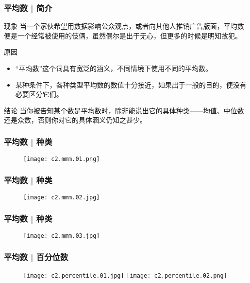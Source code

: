 \begin{frame}
  \frametitle{平均数 | 简介}
  \begin{block}{现象}
    当一个家伙希望用数据影响公众观点，或者向其他人推销广告版面，平均数便是一个经常被使用的伎俩，虽然偶尔是出于无心，但更多的时候是明知故犯。
  \end{block}
  \pause
  \begin{block}{原因}
    \begin{itemize}
      \item “平均数”这个词具有宽泛的涵义，不同情境下使用不同的平均数。
      \item 某种条件下，各种类型平均数的数值十分接近，如果出于一般的目的，便没有必要区分它们。
    \end{itemize}
  \end{block}
  \pause
  \begin{block}{结论}
    当你被告知某个数是平均数时，除非能说出它的具体种类——均值、中位数还是众数，否则你对它的具体涵义仍知之甚少。
  \end{block}
\end{frame}

\begin{frame}
  \frametitle{平均数 | 种类}
  \begin{figure}
    \centering
    \texttt{[image: c2.mmm.01.png]}
  \end{figure}
\end{frame}

\begin{frame}
  \frametitle{平均数 | 种类}
  \begin{figure}
    \centering
    \texttt{[image: c2.mmm.02.jpg]}
  \end{figure}
\end{frame}

\begin{frame}
  \frametitle{平均数 | 种类}
  \begin{figure}
    \centering
    \texttt{[image: c2.mmm.03.jpg]}
  \end{figure}
\end{frame}

\begin{frame}
  \frametitle{平均数 | 百分位数}
  \begin{figure}
    \centering
    \texttt{[image: c2.percentile.01.jpg]}
    \texttt{[image: c2.percentile.02.png]}
  \end{figure}
\end{frame}

